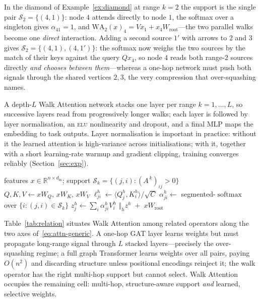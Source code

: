 \documentclass[runningheads]{llncs}
\newcommand{\RR}{\mathbb{R}}
\newcommand{\Adj}{A}
\DeclareMathOperator{\softmax}{softmax}
\begin{document}
\begin{example}\label{ex:layer}
In the diamond of Example~\ref{ex:diamond} at range $k=2$ the support is the
single pair $\mathcal{S}_2=\{(4,1)\}$: node $4$ attends directly to node $1$,
the softmax over a singleton gives $\alpha_{41}=1$, and
$\mathrm{WA}_2(x)_4=Vx_1+x_4W_{\!\text{root}}$---the two parallel walks become
one \emph{direct} interaction. Adding a second source $1'$ with arrows to $2$
and $3$ gives $\mathcal{S}_2=\{(4,1),(4,1')\}$: the softmax now weighs the two
sources by the match of their keys against the query $Qx_4$, so node $4$ reads
both range-$2$ sources directly \emph{and chooses between them}---whereas a
one-hop network must push both signals through the shared vertices $2,3$, the
very compression that over-squashing names.
\end{example}

A depth-$L$ Walk Attention network stacks one layer per range $k=1,\dots,L$, so
successive layers read from progressively longer walks; each layer is followed
by layer normalisation, an \textsc{elu} nonlinearity and dropout, and a final
MLP maps the embedding to task outputs. Layer normalisation is important in
practice: without it the learned attention is high-variance across
initialisations; with it, together with a short learning-rate warmup and
gradient clipping, training converges reliably (Section~\ref{sec:exp}).

\begin{algorithm}[t]
\caption{Walk Attention layer at range $k$ (sparse).}\label{alg:wa}
\begin{algorithmic}[1]
\Require features $x\in\RR^{n\times d_{\text{in}}}$; support
  $\mathcal{S}_k=\{(j,i):(\Adj^{\,k})_{ij}>0\}$
\State $Q,K,V \gets xW_Q,\,xW_K,\,xW_V$ 
  \State $\ell^h_{ji}\gets \langle Q^h_j,K^h_i\rangle/\sqrt{C}$
\EndFor
\State $\alpha^h_{ji}\gets$ segmented-$\softmax$ over $\{i:(j,i)\in\mathcal{S}_k\}$
\State $z^h_j\gets \sum_i \alpha^h_{ji}V^h_i$ 
\State \Return $\bigl\Vert_h z^h \;+\; xW_{\!\text{root}}$
\end{algorithmic}
\end{algorithm}

Table~\ref{tab:relation} situates Walk Attention among related operators along
the two axes of~\eqref{eq:attn-generic}. A one-hop GAT layer learns weights but
must propagate long-range signal through $L$ stacked layers---precisely the
over-squashing regime; a full graph Transformer learns weights over all pairs,
paying $O(n^2)$ and discarding structure unless positional encodings reinject
it; the walk operator has the right multi-hop support but cannot select. Walk
Attention occupies the remaining cell: multi-hop, structure-aware support
\emph{and} learned, selective weights.
\end{document}
